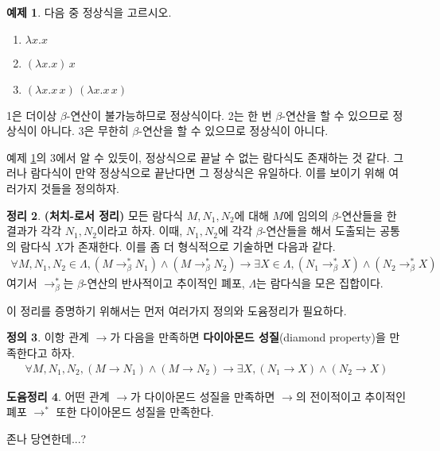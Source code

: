 \documentclass[b5paper, 10pt]{book}
\theoremstyle{definition}
\newtheorem{defn}{정의}[chapter]
\newtheorem{thm}[defn]{정리}
\newtheorem{ex}[defn]{예제}
\newtheorem{lem}[defn]{도윰정리}
\newenvironment{pf*}{\pushQED{\qed}\pf}{\popQED\endpf}
\begin{document}
\begin{ex}
    \label{normal form ex}
    다음 중 정상식을 고르시오.
    \begin{enumerate}
        \item $\lambda x. x$
        \item $(\lambda x. x) \, x$
        \item $(\lambda x.x \, x) \, (\lambda x. x \, x)$
    \end{enumerate}
    1은 더이상 $\beta$-연산이 불가능하므로 정상식이다. 2는 한 번 $\beta$-연산을 할 수 
    있으므로 정상식이 아니다. 3은 무한히 $\beta$-연산을 할 수 있으므로
    정상식이 아니다.
\end{ex}
예제 \ref{normal form ex}의 3에서 알 수 있듯이, 정상식으로 끝날 수 없는 람다식도
존재하는 것 같다. 그러나 람다식이 만약 정상식으로 끝난다면 그 정상식은 유일하다. 이를
보이기 위해 여러가지 것들을 정의하자.
\begin{thm} \label{church-rosser}
    \textbf{(처치-로서 정리)} 모든 람다식 $M, N_1, N_2$에 대해 $M$에 
    임의의 $\beta$-연산들을 한 결과가 각각 $N_1, N_2$이라고 하자. 이때,
    $N_1, N_2$에 각각 $\beta$-연산들을 해서 도출되는 공통의 람다식 $X$가 존재한다.
    이를 좀 더 형식적으로 기술하면 다음과 같다.
    \begin{align*}
        \forall M, N_1, N_2 \in \Lambda, (M \rightarrow_\beta^* N_1) \wedge 
        (M \rightarrow_\beta^* N_2) \rightarrow \exists X \in \Lambda,
        (N_1 \rightarrow_\beta^* X) \wedge (N_2 \rightarrow_\beta^* X)
    \end{align*}
    여기서 $\rightarrow_\beta^*$는 $\beta$-연산의 
    반사적이고 추이적인 폐포, $\Lambda$는 람다식을 모은 집합이다.
\end{thm}
이 정리를 증명하기 위해서는 먼저 여러가지 정의와 도윰정리가 필요하다.
\begin{defn}
    이항 관계 $\rightarrow$가 다음을 만족하면 \textbf{다이아몬드 성질}(diamond
    property)을 만족한다고 하자.
    \begin{align*}
        \forall M, N_1, N_2, (M \rightarrow N_1) \wedge (M \rightarrow N_2) 
        \rightarrow \exists X, (N_1 \rightarrow X) \wedge (N_2 \rightarrow X)
    \end{align*}
\end{defn}
\begin{lem} \label{diamond property lemma}
    어떤 관계 $\rightarrow$가 다이아몬드 성질을 만족하면 $\rightarrow$의 전이적이고 추이적인
    폐포 $\rightarrow^*$ 또한 다이아몬드 성질을 만족한다.
\end{lem}
\begin{pf*}
    존나 당연한데...?
\end{pf*}
\end{document}
